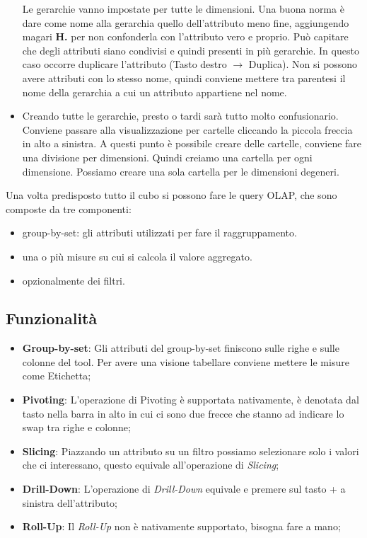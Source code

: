 \begin{itemize}
	Le gerarchie vanno impostate per tutte le dimensioni. Una buona norma è dare come nome alla gerarchia quello dell'attributo meno fine, aggiungendo magari \textbf{H.} per non confonderla con l'attributo vero e proprio.\newline
	Può capitare che degli attributi siano condivisi e quindi presenti in più gerarchie. In questo caso occorre duplicare l'attributo (Tasto destro $\xrightarrow{}$ Duplica). Non si possono avere attributi con lo stesso nome, quindi conviene mettere tra parentesi il nome della gerarchia a cui un attributo appartiene nel nome.\newline
	\item Creando tutte le gerarchie, presto o tardi sarà tutto molto confusionario. Conviene passare alla visualizzazione per cartelle cliccando la piccola freccia in alto a sinistra. A questi punto è possibile creare delle cartelle, conviene fare una divisione per dimensioni. Quindi creiamo una cartella per ogni dimensione. Possiamo creare una sola cartella per le dimensioni degeneri.
\end{itemize}
Una volta predisposto tutto il cubo si possono fare le query OLAP, che sono composte da tre componenti:
\begin{itemize}
	\item group-by-set: gli attributi utilizzati per fare il raggruppamento.
	\item una o più misure su cui si calcola il valore aggregato.
	\item opzionalmente dei filtri.
\end{itemize}


\subsection{Funzionalità}
\begin{itemize}
	\item \textbf{Group-by-set}: Gli attributi del group-by-set finiscono sulle righe e sulle colonne del tool. Per avere una visione tabellare conviene mettere le misure come Etichetta;
	\item \textbf{Pivoting}: L'operazione di Pivoting è supportata nativamente, è denotata dal tasto nella barra in alto in cui ci sono due frecce che stanno ad indicare lo swap tra righe e colonne;
	\item \textbf{Slicing}: Piazzando un attributo su un filtro possiamo selezionare solo i valori che ci interessano, questo equivale all'operazione di \textit{Slicing};
	\item \textbf{Drill-Down}: L'operazione di \textit{Drill-Down} equivale e premere sul tasto + a sinistra dell'attributo;
	\item \textbf{Roll-Up}: Il \textit{Roll-Up} non è nativamente supportato, bisogna fare a mano;
\end{itemize}

